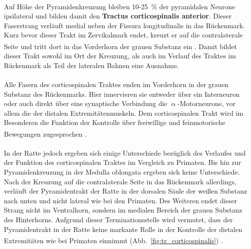 \\ \noindent Auf Höhe der Pyramidenkreuzung bleiben 10-25~\% der pyramidalen Neurone ipsilateral und bilden damit den \textbf{Tractus corticospinalis anterior}. Dieser Faserstrang verläuft medial neben der Fissura longitudinalis in das  Rückenmark. Kurz bevor dieser Trakt im Zervikalmark endet, kreuzt er auf die contralaterale Seite und tritt dort in das Vorderhorn der grauen Substanz ein \textsuperscript{\cite[3]{trepel2011neuroanatomie}}. Damit bildet dieser Trakt sowohl im Ort der Kreuzung, als auch im Verlauf des Traktes im Rückenmark als Teil der lateralen Bahnen eine Ausnahme. \\
\\ \noindent Alle Fasern des corticospinalen Traktes enden im Vorderhorn in der grauen Substanz des Rückenmarks. Hier innervieren sie entweder über ein Interneuron oder auch direkt über eine synaptische Verbindung die $\upalpha$-Motorneurone, vor allem die der distalen Extremitätenmuskeln. Dem corticospinalen Trakt wird im Besonderen die Funktion der Kontrolle über freiwillige und feinmotorische Bewegungen zugesprochen \textsuperscript{\cite[3]{trepel2011neuroanatomie}}. \\
\\ \noindent In der Ratte jedoch ergeben sich einige Unterschiede bezüglich des Verlaufes und der Funktion des corticospinalen Traktes im Vergleich zu Primaten. Bis hin zur Pyramidenkreuzung in der Medulla oblongata ergeben sich keine Unterschiede. Nach der Kreuzung auf die contralaterale Seite in das Rückenmark allerdings, verläuft der Pyramidentrakt der Ratte in der dorsalen Säule der weißen Substanz nach unten und nicht lateral wie bei den Primaten. Des Weiteren endet dieser Strang nicht im Ventralhorn, sondern im medialen Bereich der grauen Substanz des Hinterhorns. Aufgrund dieser Terminationsstelle wird vermutet, dass der Pyramidentrakt in der Ratte keine markante Rolle in der Kontrolle der distalen Extremitäten wie bei Primaten einnimmt (Abb.~\ref{fig:tr_corticospinalis}) \textsuperscript{\cite[8]{paxinos2014rat}}.  

